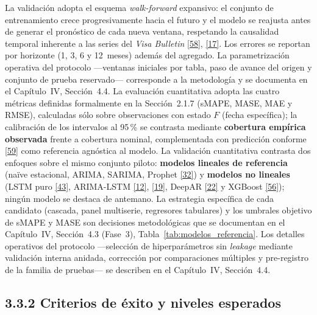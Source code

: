 \documentclass[12pt,letterpaper]{report}
\newcommand{\cita}[1]{\hyperref[bib:#1]{[#1]}}
\begin{document}
La validación adopta el esquema \textit{walk-forward} expansivo: el conjunto de entrenamiento crece progresivamente hacia el futuro y el modelo se reajusta antes de generar el pronóstico de cada nueva ventana, respetando la causalidad temporal inherente a las series del \textit{Visa Bulletin} \cita{58}, \cita{17}. Los errores se reportan por horizonte (1, 3, 6 y 12~meses) además del agregado. La parametrización operativa del protocolo ---ventanas iniciales por tabla, paso de avance del origen y conjunto de prueba reservado--- corresponde a la metodología y se documenta en el Capítulo~IV, Sección~4.4. La evaluación cuantitativa adopta las cuatro métricas definidas formalmente en la Sección~2.1.7 (sMAPE, MASE, MAE y RMSE), calculadas sólo sobre observaciones con estado $F$ (fecha específica); la calibración de los intervalos al 95\,\% se contrasta mediante \textbf{cobertura empírica observada} frente a cobertura nominal, complementada con predicción conforme \cita{59} como referencia agnóstica al modelo. La validación cuantitativa contrasta dos enfoques sobre el mismo conjunto piloto: \textbf{modelos lineales de referencia} (naïve estacional, ARIMA, SARIMA, Prophet \cita{32}) y \textbf{modelos no lineales} (LSTM puro \cita{43}, ARIMA-LSTM \cita{12}, \cita{19}, DeepAR \cita{22} y XGBoost \cita{56}); ningún modelo se destaca de antemano. La estrategia específica de cada candidato (cascada, panel multiserie, regresores tabulares) y los umbrales objetivo de sMAPE y MASE son decisiones metodológicas que se documentan en el Capítulo~IV, Sección~4.3 (Fase~3), Tabla~\ref{tab:modelos_referencia}. Los detalles operativos del protocolo ---selección de hiperparámetros sin \textit{leakage} mediante validación interna anidada, corrección por comparaciones múltiples y pre-registro de la familia de pruebas--- se describen en el Capítulo~IV, Sección~4.4.

\subsection*{3.3.2 Criterios de éxito y niveles esperados}
\end{document}
